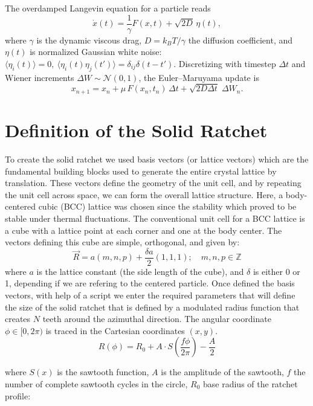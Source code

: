 The overdamped Langevin equation for a particle reads
\[
  \dot{x}(t)= \frac{1}{\gamma} F(x,t)+\sqrt{2D}\,\eta(t),
\]
where $\gamma$ is the dynamic viscous drag, \(D=k_BT/\gamma\) the diffusion coefficient,
and \(\eta(t)\) is normalized Gaussian white noise:
\(\langle\eta_i(t)\rangle=0,\ \langle\eta_i(t)\eta_j(t')\rangle=\delta_{ij}\delta(t-t')\).
Discretizing with timestep \(\Delta t\) and Wiener increments \(\Delta W\sim\mathcal N(0, 1)\),
the Euler--Maruyama update is
\begin{equation}
x_{n+1} =  x_n + \mu\, F( x_n,t_n)\,\Delta t
  + \sqrt{2D \Delta t}\;\Delta W_n.
\label{eq:em_overdamped}
\end{equation}
\section{Definition of the Solid Ratchet}

To create the solid ratchet we used basis vectors (or lattice vectors) which are the fundamental building blocks used to generate the entire crystal lattice by translation. These vectors define the geometry of the unit cell, and by repeating the unit cell across space, we can form the overall lattice structure. Here, a body-centered cubic (BCC) lattice was chosen since the stability which proved to be stable under thermal fluctuations.
The conventional unit cell for a BCC lattice is a cube with a lattice point at each corner and one at the body center. The vectors defining this cube are simple, orthogonal, and given by:
%
\begin{equation}
  \vec{R} = a(m, n, p) + \frac{\delta a}{2}(1, 1, 1); \quad m,n,p \in \mathbb{Z}
\end{equation}
%
where \( a \) is the lattice constant (the side length of the cube), and $\delta$ is either 0 or 1, depending if we are refering to the centered particle. Once defined the basis vectors, with help of a script we enter the required parameters that will define the size of the solid ratchet that is defined by a modulated radius function that creates $N$ teeth around the azimuthal direction. The angular coordinate $\phi \in [0, 2\pi)$ is traced in the Cartesian coordinates $(x, y)$.
\begin{equation}
R(\phi) = R_0 + A \cdot S\left(\frac{f\phi}{2\pi}\right) - \frac{A}{2}
\end{equation}

where $S(x)$ is the sawtooth function, $A$ is the amplitude of the sawtooth, $f$ the number of complete sawtooth cycles in the circle, $R_0$ base radius of the ratchet profile:

